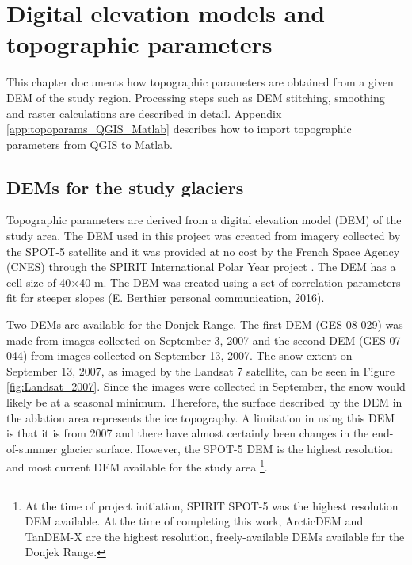 \documentclass{sfuthesis}
\begin{document}
\chapter{Digital elevation models and topographic parameters}

This chapter documents how topographic parameters are obtained from a given DEM of the study region. Processing steps such as DEM stitching, smoothing and raster calculations are described in detail.  Appendix \ref{app:topoparams_QGIS_Matlab} describes how to import topographic parameters from QGIS to Matlab. 

\section{DEMs for the study glaciers}

Topographic parameters are derived from a digital elevation model (DEM) of the study area. The DEM used in this project was created from imagery collected by the SPOT-5 satellite and it was provided at no cost by the French Space Agency (CNES) through the SPIRIT International Polar Year project \citep{Korona2009}. The DEM has a cell size of 40$\times$40 m. The DEM was created using a set of correlation parameters fit for steeper slopes (E. Berthier personal communication, 2016). 

Two DEMs are available for the Donjek Range. The first DEM (GES 08-029) was made from images collected on September 3, 2007 and the second DEM (GES 07-044) from images collected on September 13, 2007. The snow extent on September 13, 2007, as imaged by the Landsat 7 satellite, can be seen in Figure \ref{fig:Landsat_2007}. Since the images were collected in September, the snow would likely be at a seasonal minimum. Therefore, the surface described by the DEM in the ablation area represents the ice topography. A limitation in using this DEM is that it is from 2007 and there have almost certainly been changes in the end-of-summer glacier surface. However, the SPOT-5 DEM is the highest resolution and most current DEM available for the study area \footnote{At the time of project initiation, SPIRIT SPOT-5 was the highest resolution DEM available. At the time of completing this work, ArcticDEM and TanDEM-X are the highest resolution, freely-available DEMs available for the Donjek Range.}. 
\end{document}
